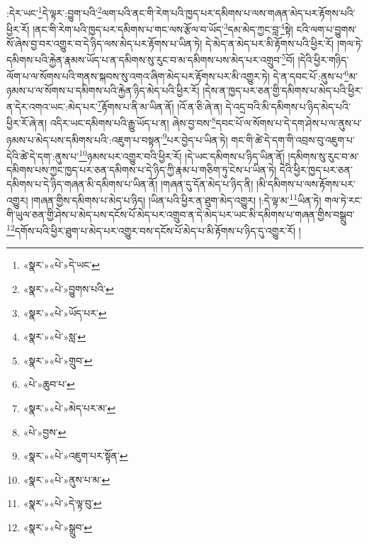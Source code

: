 :དེར་ཡང་\footnote{«སྣར་»«པེ་»དེ་ཡང་}དེ་ལྟར་:བྱུག་པའི་\footnote{«སྣར་»«པེ་»བྱུགས་པའི་}ལག་པའི་ནང་གི་རེག་པའི་ཁྱད་པར་དམིགས་པ་ལས་གཞན་མེད་པར་རྟོགས་པའི་ཕྱིར་རོ། །ནང་གི་རེག་པའི་ཁྱད་པར་དམིགས་པ་གང་ལས་རྩོལ་བ་ཡོད་\footnote{«སྣར་»«པེ་»ཡོད་པར་}དམ་མེད་ཀྱང་བླ་\footnote{«སྣར་»«པེ་»སླ་}སྟེ། ངའི་ལག་པ་བྱུགས་སོ་ཞེས་བྱ་བར་འགྱུར་བ་དེ་ཉིད་ལས་མེད་པར་རྟོགས་པ་ཡིན་ཏེ། དེ་མེད་ན་མེད་པར་མི་རྟོགས་པའི་ཕྱིར་རོ། །གལ་ཏེ་དམིགས་པའི་རྐྱེན་རྣམས་ཡོད་པ་ན་དམིགས་སུ་རུང་བ་མ་དམིགས་པས་མེད་པར་འགྲུབ་\footnote{«སྣར་»«པེ་»གྲུབ་}བོ། །དེའི་ཕྱིར་གཉིད་ལོག་པ་ལ་སོགས་པའི་གནས་སྐབས་སུ་འགའ་ཞིག་མེད་པར་རྟོགས་པར་མི་འགྱུར་ཏེ། དེ་ན་དབང་པོ་:ནུས་པ་\footnote{«པེ་»ཆུབ་པ་}མ་ཉམས་པ་ལ་སོགས་པ་དམིགས་པའི་རྐྱེན་ཉིད་མེད་པའི་ཕྱིར་རོ། །དེས་ན་ཁྱད་པར་ཅན་གྱི་དམིགས་པ་མེད་པའི་ཕྱིར་ན་དེར་འགའ་ཡང་:མེད་པར་\footnote{«སྣར་»«པེ་»མེད་པར་མ་}རྟོགས་པ་ནི་མ་ཡིན་ནོ། །འོ་ན་ཅི་ཞེ་ན། དེ་འདྲ་བའི་མི་དམིགས་པ་ཉིད་མེད་པའི་ཕྱིར་རོ་ཞེ་ན། འདིར་ཡང་དམིགས་པའི་རྒྱུ་ཡོད་པ་ན། ཞེས་བྱ་བས་\footnote{«པེ་»བྱས་}དབང་པོ་ལ་སོགས་པ་དེ་དག་ཤེས་པ་ལ་ནུས་པ་ཉམས་པ་མེད་པས་དམིགས་པའི་:འཇུག་པ་བསྟན་\footnote{«སྣར་»«པེ་»འཇུག་པར་སྟོན་}པར་བྱེད་པ་ཡིན་ཏེ། གང་གི་ཚེ་དེ་དག་གི་འབྲས་བུ་འཇུག་པ་དེའི་ཚེ་དེ་དག་:ནུས་པ་\footnote{«སྣར་»«པེ་»ནུས་པ་མ་}ཉམས་པར་འགྱུར་བའི་ཕྱིར་རོ། །དེ་ཡང་དམིགས་པ་ཉིད་ཡིན་ནོ། །དམིགས་སུ་རུང་བ་མ་དམིགས་པས་ཀྱང་ཁྱད་པར་ཅན་དམིགས་པ་དེ་ཉིད་ཀྱི་རྣམ་པ་གཅིག་ཏུ་ངེས་པ་ཡིན་ཏེ། དེའི་ཕྱིར་ཁྱད་པར་ཅན་དམིགས་པ་དེ་ཉིད་གཞན་མི་དམིགས་པ་ཡིན་ནོ། །གཞན་དུ་དོན་མེད་པ་ཉིད་ནི། །མི་དམིགས་པ་ལས་རྟོགས་པར་འགྱུར། །གཞན་གྱིས་དམིགས་པ་མེད་པ་ཉིད། །ཡིན་པའི་ཕྱིར་ན་ཐུག་མེད་འགྱུར། །:དེ་ལྟ་མ་\footnote{«སྣར་»«པེ་»དེ་ལྟ་བུ་}ཡིན་ཏེ། གལ་ཏེ་རང་གི་ཡུལ་ཅན་གྱི་ཤེས་པ་མེད་པས་དངོས་པོ་མེད་པར་འགྲུབ་ན་དེ་མེད་པར་ཡང་མི་དམིགས་པ་གཞན་གྱིས་བསྒྲུབ་\footnote{«སྣར་»«པེ་»སྒྲུབ་}དགོས་པའི་ཕྱིར་ཐུག་པ་མེད་པར་འགྱུར་བས་དངོས་པོ་མེད་པ་མི་རྟོགས་པ་ཉིད་དུ་འགྱུར་རོ། །

